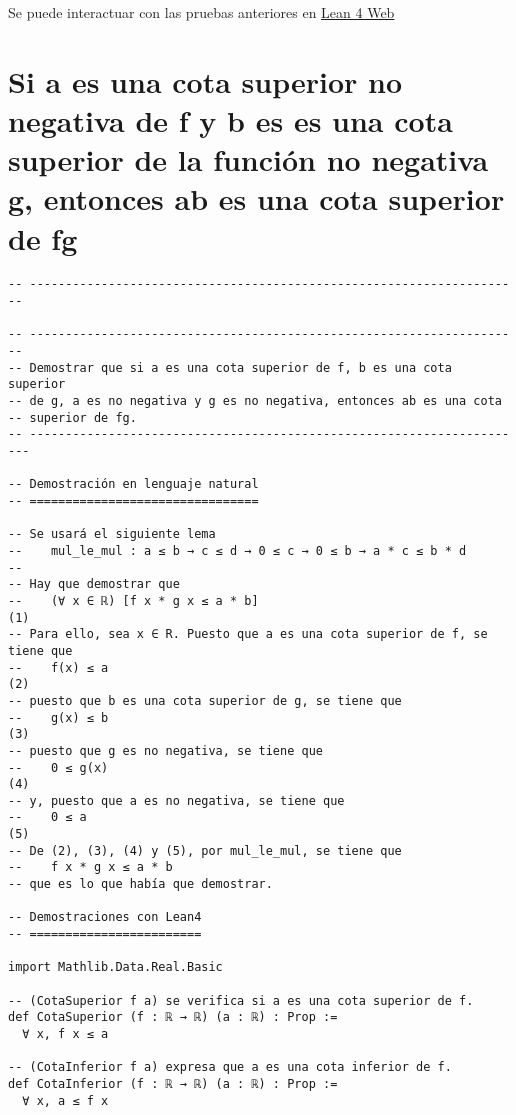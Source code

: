 Se puede interactuar con las pruebas anteriores en \href{https://lean.math.hhu.de/\#url=https://raw.githubusercontent.com/jaalonso/Calculemus2/main/src/Producto\_de\_funciones\_no\_negativas.lean}{Lean 4 Web}

\section{Si a es una cota superior no negativa de f y b es es una cota superior de la función no negativa g, entonces ab es una cota superior de fg}
\label{sec:orgd6d3023}
\begin{verbatim}
-- ---------------------------------------------------------------------

-- ---------------------------------------------------------------------
-- Demostrar que si a es una cota superior de f, b es una cota superior
-- de g, a es no negativa y g es no negativa, entonces ab es una cota
-- superior de fg.
-- ----------------------------------------------------------------------

-- Demostración en lenguaje natural
-- ================================

-- Se usará el siguiente lema
--    mul_le_mul : a ≤ b → c ≤ d → 0 ≤ c → 0 ≤ b → a * c ≤ b * d
--
-- Hay que demostrar que
--    (∀ x ∈ ℝ) [f x * g x ≤ a * b]                                    (1)
-- Para ello, sea x ∈ R. Puesto que a es una cota superior de f, se tiene que
--    f(x) ≤ a                                                         (2)
-- puesto que b es una cota superior de g, se tiene que
--    g(x) ≤ b                                                         (3)
-- puesto que g es no negativa, se tiene que
--    0 ≤ g(x)                                                         (4)
-- y, puesto que a es no negativa, se tiene que
--    0 ≤ a                                                            (5)
-- De (2), (3), (4) y (5), por mul_le_mul, se tiene que
--    f x * g x ≤ a * b
-- que es lo que había que demostrar.

-- Demostraciones con Lean4
-- ========================

import Mathlib.Data.Real.Basic

-- (CotaSuperior f a) se verifica si a es una cota superior de f.
def CotaSuperior (f : ℝ → ℝ) (a : ℝ) : Prop :=
  ∀ x, f x ≤ a

-- (CotaInferior f a) expresa que a es una cota inferior de f.
def CotaInferior (f : ℝ → ℝ) (a : ℝ) : Prop :=
  ∀ x, a ≤ f x


\end{verbatim}
